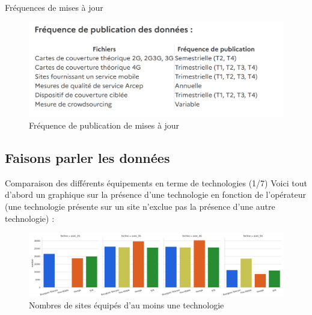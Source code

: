 \begin{frame}{Fréquences de mises à jour}
    \begin{figure}
        \includegraphics[height=0.5\paperheight]{images/frequence.png}
        \caption{\label{fig:freq}Fréquence de publication de mises à jour}
    \end{figure}
\end{frame}


\subsection{Faisons parler les données}
\insertsubsectionframe



\begin{frame}{Comparaison des différents équipements en terme de technologies (1/7)}
    Voici tout d'abord un graphique sur la présence d'une technologie en fonction de l'opérateur (une technologie présente sur un site n'exclue pas la présence d'une autre technologie) :
    \begin{figure}
        \includegraphics[height=0.4\paperheight]{images/barplots/avec_techno.png}
        \caption{\label{fig:av_tech}Nombres de sites équipés d'au moins une technologie}
    \end{figure}
        
\end{frame}

